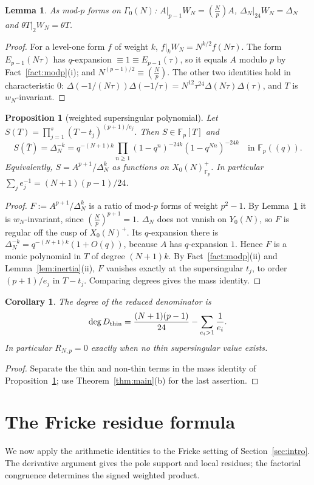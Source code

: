 \documentclass[11pt,a4paper]{article}
\numberwithin{equation}{section}
\newtheorem{proposition}[theorem]{Proposition}
\newtheorem{lemma}[theorem]{Lemma}
\newtheorem{corollary}[theorem]{Corollary}
\theoremstyle{definition}
\theoremstyle{remark}
\newcommand{\Fp}{\mathbb F_p}
\newcommand{\Lp}[1]{\left(\frac{#1}{p}\right)}
\begin{document}
\begin{lemma}\label{lem:AW}
As mod-$p$ forms on $\Gamma_0(N)$: $A|_{p-1}W_N=\Lp{N}A$, $\Delta_N|_{24}W_N=\Delta_N$ and
$\theta T|_2W_N=\theta T$.
\end{lemma}
\begin{proof}
For a level-one form $f$ of weight $k$, $f|_kW_N=N^{k/2}f(N\tau)$. The form $E_{p-1}(N\tau)$ has
$q$-expansion $\equiv1\equiv E_{p-1}(\tau)$, so it equals $A$ modulo $p$ by Fact~\ref{fact:modp}(i);
and $N^{(p-1)/2}\equiv\Lp N$. The other two identities hold in characteristic $0$:
$\Delta(-1/(N\tau))\Delta(-1/\tau)=N^{12}\tau^{24}\Delta(N\tau)\Delta(\tau)$, and $T$ is
$w_N$-invariant.
\end{proof}

\begin{proposition}[weighted supersingular polynomial]\label{prop:S}
Let $S(T)=\prod_{j=1}^s(T-t_j)^{(p+1)/e_j}$. Then $S\in\Fp[T]$ and
\[
S(\overline T)=\Delta_N^{-k}=q^{-(N+1)k}\prod_{n\ge1}(1-q^n)^{-24k}(1-q^{Nn})^{-24k}\quad\text{in }\Fp((q)).
\]
Equivalently, $S=A^{p+1}/\Delta_N^{k}$ as functions on $X_0(N)^+_{\Fp}$. In particular
$\sum_j e_j^{-1}=(N+1)(p-1)/24$.
\end{proposition}
\begin{proof}
$F:=A^{p+1}/\Delta_N^k$ is a ratio of mod-$p$ forms of weight $p^2-1$. By Lemma~\ref{lem:AW} it is
$w_N$-invariant, since $\Lp N^{p+1}=1$. $\Delta_N$ does not vanish on $Y_0(N)$, so $F$ is regular off the cusp of
$X_0(N)^+$. Its $q$-expansion there is $\Delta_N^{-k}=q^{-(N+1)k}(1+O(q))$, because $A$ has
$q$-expansion $1$. Hence $F$ is a monic polynomial in $T$ of degree $(N+1)k$. By
Fact~\ref{fact:modp}(ii) and Lemma~\ref{lem:inertia}(ii), $F$ vanishes exactly at the supersingular
$t_j$, to order $(p+1)/e_j$ in $T-t_j$. Comparing degrees gives the mass identity.
\end{proof}

\begin{corollary}\label{cor:degree}
The degree of the reduced denominator is
\[
\deg D_{\rm thin}=\frac{(N+1)(p-1)}{24}-\sum_{e_i>1}\frac1{e_i}.
\]
In particular $R_{N,p}=0$ exactly when no thin supersingular value exists.
\end{corollary}
\begin{proof}
Separate the thin and non-thin terms in the mass identity of
Proposition~\ref{prop:S}; use Theorem~\ref{thm:main}(b) for the last assertion.
\end{proof}

\section{The Fricke residue formula}\label{sec:kz}
We now apply the arithmetic identities to the Fricke setting of
Section~\ref{sec:intro}. The derivative argument gives the pole support
and local residues; the factorial congruence determines the signed
weighted product.
\end{document}
